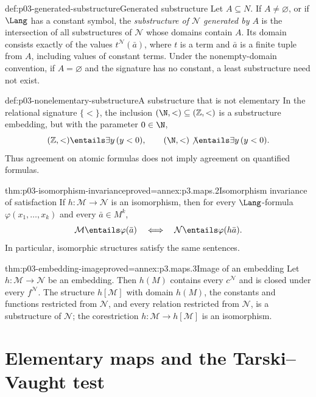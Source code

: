 \begin{hbdefinition}{def:p03-generated-substructure}{Generated substructure}
Let \(A\subseteq N\).  If \(A\ne\varnothing\), or if \(\Lang\) has a constant
symbol, the \emph{substructure of \(\mathcal N\) generated by \(A\)} is the
intersection of all substructures of \(\mathcal N\) whose domains contain
\(A\).  Its domain consists exactly of the values
\(t^{\mathcal N}(\bar a)\), where \(t\) is a term and \(\bar a\) is a finite
tuple from \(A\), including values of constant terms.  Under the nonempty-domain
convention, if \(A=\varnothing\) and the signature has no constant, a least
substructure need not exist.
\end{hbdefinition}

\begin{hbexample}{def:p03-nonelementary-substructure}{A substructure that is not elementary}
In the relational signature \(\{<\}\), the inclusion
\((\N,<)\subseteq(\mathbb Z,<)\) is a substructure embedding, but with the
parameter \(0\in\N\),
\[
 (\mathbb Z,<)\entails\exists y\,(y<0),
 \qquad
 (\N,<)\not\entails\exists y\,(y<0).
\]
Thus agreement on atomic formulas does not imply agreement on quantified
formulas.
\end{hbexample}

\begin{hblemma}{thm:p03-isomorphism-invariance}{proved=annex:p3.maps.2}{Isomorphism invariance of satisfaction}
If \(h:\mathcal M\to\mathcal N\) is an isomorphism, then for every
\(\Lang\)-formula \(\varphi(x_1,\ldots,x_k)\) and every
\(\bar a\in M^k\),
\[
 \mathcal M\entails\varphi(\bar a)
 \quad\Longleftrightarrow\quad
 \mathcal N\entails\varphi(h\bar a).
\]
In particular, isomorphic structures satisfy the same sentences.
\end{hblemma}

\begin{hblemma}{thm:p03-embedding-image}{proved=annex:p3.maps.3}{Image of an embedding}
Let \(h:\mathcal M\to\mathcal N\) be an embedding.  Then \(h(M)\) contains
every \(c^{\mathcal N}\) and is closed under every \(f^{\mathcal N}\).  The
structure \(h[\mathcal M]\) with domain \(h(M)\), the constants and functions
restricted from \(\mathcal N\), and every relation restricted from
\(\mathcal N\), is a substructure of \(\mathcal N\); the corestriction
\(h:\mathcal M\to h[\mathcal M]\) is an isomorphism.
\end{hblemma}

\section{Elementary maps and the Tarski--Vaught test}
\label{sec:p03-elementary-maps}

